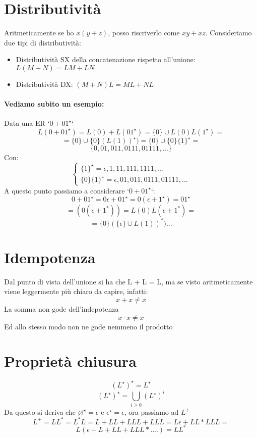 \documentclass[12pt, a4paper, openany, oneside]{book}
\begin{document}
\section{Distributività}
Aritmeticamente se ho $x(y+z)$, posso riscriverlo come $xy+xz$.
Consideriamo due tipi di distributività:
\begin{itemize}
	\item Distributività SX della concatenazione rispetto all'unione: \\
	$L(M+N) = LM + LN$
	\item Distributività DX: $(M+N)L = ML + NL$
\end{itemize}
\paragraph{Vediamo subito un esempio: } Data una ER `$0+01^{\star}$`
\[
	L(0+01^{\star}) = L(0) + L(01^{\star}) = \{0\} \cup L(0)L(1^{\star}) =
\]
\[
	= \{0\} \cup \{0\} (L(1))^{\star}) = \{0\} \cup \{0\} \{1\}^{\star} = 
\]
\[
	\{0,01,011,0111, 01111, ...\}
\]
Con:
\[
\begin{cases}
	\{1\}^{\star} = \epsilon, 1, 11, 111, 1111, ... \\
	\{0\} \{1\}^{\star} = \epsilon, 01, 011, 0111, 01111, ...
\end{cases}
\]
A questo punto passiamo a considerare `$0+01^{\star}$`:
\[
	0+01^{\star} = 0\epsilon + 01^{\star} = 0(\epsilon + 1^{\star}) = 01^{\star}
\]
\[
	= (0(\epsilon + 1^{*})) = L(0) L(\epsilon + 1^{*}) = 
\]
\[
	= \{0\} (\{\epsilon\} \cup L(1))^{*}) ...
\]
\section{Idempotenza}
Dal punto di vista dell'unione si ha che L + L = L, ma se visto aritmeticamente
viene leggermente più chiaro da capire, infatti:
\[x+x\neq x\]
La somma non gode dell'indepotenza
\[x\cdot x\neq x\]
Ed allo stesso modo non ne gode nemmeno il prodotto
\section{Proprietà chiusura}
\[
	(L^{\star})^{\star} = L^{\star}
\]
\[
	(L^{\star})^{\star} = \bigcup \limits _{i \geq 0} {(L^{\star})^{i}}
\]
Da questo si deriva che $\varnothing^{\star}=\epsilon$ e $\epsilon^{\star}=\epsilon$,
ora passiamo ad $L^{+}$
\[
	L^{+} = LL^{*} = L^{*}L = L + LL + LLL + LLL = L\epsilon + LL * LLL =
\]	
\[
	L(\epsilon + L + LL + LLL * ....) = LL^{*}
\]	
\end{document}
